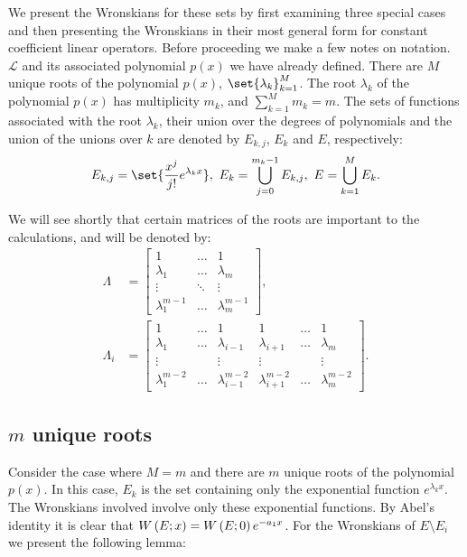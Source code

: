 \documentclass{article}
\begin{document}
We present the Wronskians for these sets by first examining three special cases and then presenting the Wronskians in their most general form for constant coefficient linear operators.
Before proceeding we make a few notes on notation.
$\mathcal{L}$ and its associated polynomial $p(x)$ we have already defined.
There are $M$ unique roots of the polynomial $p(x)$, $\set{\lambda_k}_{k=1}^M$.
The root $\lambda_k$ of the polynomial $p(x)$ has multiplicity $m_k$, and $\sum_{k=1}^M m_k = m$.
The sets of functions associated with the root $\lambda_k$, their union over the degrees of polynomials and the union of the unions over $k$ are denoted by $E_{k,j}$, $E_k$ and $E$, respectively:
\begin{equation*}
E_{k,j} = \set{\Poly{j} e^{\lambda_k x}}, \ E_k = \bigcup_{j=0}^{m_k - 1} E_{k,j}, \ E = \bigcup_{k=1}^M E_k .
\end{equation*}

We will see shortly that certain matrices of the roots are important to the calculations, and will be denoted by:
\begin{align*}
\Lambda & = \begin{bmatrix} 1 & \dots & 1 \\ \lambda_1 & \dots & \lambda_m \\ \vdots & \ddots & \vdots \\ \lambda_1^{m-1} & \dots & \lambda_m^{m-1} \end{bmatrix}, \\
\Lambda_i & = \begin{bmatrix} 1 & \dots & 1 & 1 & \dots & 1 \\ \lambda_1 & \dots & \lambda_{i-1} & \lambda_{i+1} & \dots & \lambda_m \\ \vdots & & \vdots & \vdots & & \vdots \\ \lambda_1^{m-2} & \dots & \lambda_{i-1}^{m-2} & \lambda_{i+1}^{m-2} & \dots & \lambda_m^{m-2} \end{bmatrix} .
\end{align*}

\subsection{$m$ unique roots}

Consider the case where $M=m$ and there are $m$ unique roots of the polynomial $p(x)$.
In this case, $E_k$ is the set containing only the exponential function $e^{\lambda_k x}$.
The Wronskians involved involve only these exponential functions.
By Abel's identity it is clear that $W \left ( E ; x \right ) = W \left ( E ; 0 \right ) e^{-a_1 x}$.
For the Wronskians of $E \setminus E_i$ we present the following lemma:
\end{document}
